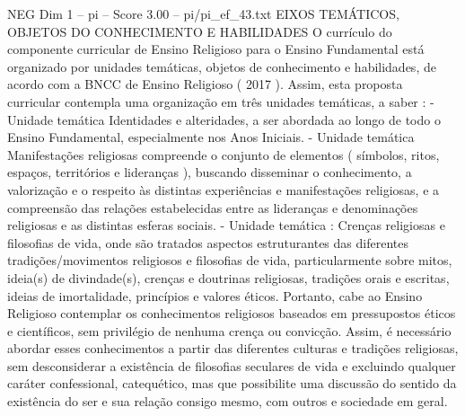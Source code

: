 \begin{textsample}{NEG Dim 1 – pi – Score 3.00 – pi/pi\_ef\_43.txt}  \label{ex:f1_neg_232}
EIXOS TEMÁTICOS, OBJETOS DO CONHECIMENTO E HABILIDADES O currículo do componente curricular de Ensino Religioso para o Ensino Fundamental está organizado por unidades temáticas, objetos de conhecimento e habilidades, de acordo com a BNCC de Ensino Religioso ( 2017 ).
Assim, esta proposta curricular contempla uma organização em três unidades temáticas, a saber : - Unidade temática Identidades e alteridades, a ser abordada ao longo de todo o Ensino Fundamental, especialmente nos Anos Iniciais. - Unidade temática Manifestações religiosas compreende o conjunto de elementos ( símbolos, ritos, espaços, territórios e lideranças ), buscando disseminar o conhecimento, a valorização e o respeito às distintas experiências e manifestações religiosas, e a compreensão das relações estabelecidas entre as lideranças e denominações religiosas e as distintas esferas sociais. - Unidade temática : Crenças religiosas e filosofias de vida, onde são tratados aspectos estruturantes das diferentes tradições/movimentos religiosos e filosofias de vida, particularmente sobre mitos, ideia(s) de divindade(s), crenças e doutrinas religiosas, tradições orais e escritas, ideias de imortalidade, princípios e valores éticos.
Portanto, cabe ao Ensino Religioso contemplar os conhecimentos religiosos baseados em pressupostos éticos e científicos, sem privilégio de nenhuma crença ou convicção.
Assim, é necessário abordar esses conhecimentos a partir das diferentes culturas e tradições religiosas, sem desconsiderar a existência de filosofias seculares de vida e excluindo qualquer caráter confessional, catequético, mas que possibilite uma discussão do sentido da existência do ser e sua relação consigo mesmo, com outros e sociedade em geral.

\end{textsample}
